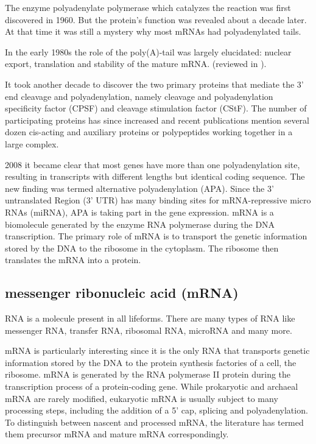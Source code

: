 The enzyme polyadenylate polymerase which catalyzes the reaction was first discovered in 1960. \cite{pmid13819354} But the protein's function was revealed about a decade later. \cite{pmid5288383} At that time it was still a mystery why most mRNAs had polyadenylated tails. 

In the early 1980s the role of the poly(A)-tail was largely elucidated: nuclear export, translation and stability of the mature mRNA. (reviewed in \cite{pmid6111419}). 

It took another decade to discover the two primary proteins that mediate the 3' end cleavage and polyadenylation, namely cleavage and polyadenylation specificity factor (CPSF) and cleavage stimulation factor (CStF). The number of participating proteins has since increased and recent publications mention several dozen cis-acting and auxiliary proteins or polypeptides working together in a large complex. \cite{pmid23774734} 

2008 it became clear that most genes have more than one polyadenylation site, resulting in transcripts with different lengths but identical coding sequence. \cite{pmid18411206} The new finding was termed alternative polyadenylation (APA). Since the 3' untranslated Region (3' UTR) has many binding sites for mRNA-repressive micro RNAs (miRNA), APA is taking part in the gene expression. \cite{pmid18566288}
mRNA is a biomolecule generated by the enzyme RNA polymerase during the DNA transcription. The primary role of mRNA is to transport the genetic information stored by the DNA to the ribosome in the cytoplasm. The ribosome then translates the mRNA into a protein. 
\subsection{messenger ribonucleic acid (mRNA)}
RNA is a molecule present in all lifeforms. There are many types of RNA like messenger RNA, transfer RNA, ribosomal RNA, microRNA and many more. 

mRNA is particularly interesting since it is the only RNA that transports genetic information stored by the DNA to the protein synthesis factories of a cell, the ribosome. mRNA is generated by the RNA polymerase II protein during the transcription process of a protein-coding gene. While prokaryotic and archaeal mRNA are rarely modified, eukaryotic mRNA is usually subject to many processing steps, including the addition of a 5' cap, splicing and polyadenylation. To distinguish between nascent and processed mRNA, the literature has termed them precursor mRNA and mature mRNA correspondingly.

